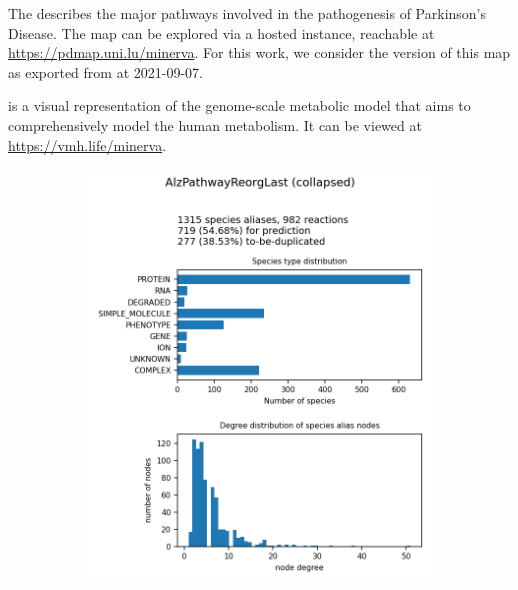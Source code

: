 \documentclass[
	fontsize=10pt, %
	twoside=false, %
	secnumdepth=1, %
  toc=indentunnumbered %
]{kaobook}
\begin{document}
The  \cite{fujita_IntegratingPathwaysParkinson_2014} describes the
major pathways involved in the pathogenesis of Parkinson's Disease. The map can
be explored via a hosted  instance, reachable at
\url{https://pdmap.uni.lu/minerva}. For this work, we consider the version of
this map as exported from  at 2021-09-07.

\cite{noronha_ReconMapInteractiveVisualization_2017}
is a visual representation of the genome-scale metabolic model
 \cite{thiele_CommunitydrivenGlobalReconstruction_2013} that aims
to comprehensively model the human metabolism. It can be viewed at \url{https://vmh.life/minerva}.

\begin{figure}[h]
  \centering
  \begin{subfigure}{0.32\textwidth}
    \includegraphics[width=\linewidth]{generated/AlzPathwayReorgLast.png}
  \end{subfigure} 
  \begin{subfigure}{0.32\textwidth}

\end{subfigure}
\end{figure}
\end{document}
